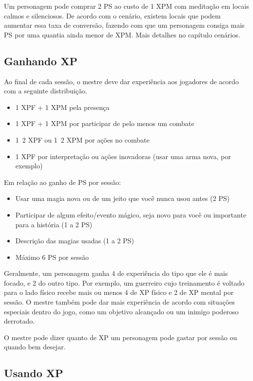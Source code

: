 Um personagem pode comprar 2 PS ao custo de 1 XPM com meditação em locais calmos e silenciosos. De acordo com o cenário, existem locais que podem aumentar essa taxa de conversão, fazendo com que um personagem consiga mais PS por uma quantia ainda menor de XPM. Mais detalhes no capítulo cenários.

\subsection{Ganhando XP}
	
Ao final de cada sessão, o mestre deve dar experiência aos jogadores de acordo com a seguinte distribuição. 

\begin{itemize}
\item  1 XPF + 1 XPM pela presença
\item  1 XPF + 1 XPM por participar de pelo menos um combate
\item  1~2 XPF ou 1~2 XPM por ações no combate
\item  1 XPF por interpretação ou ações inovadoras (usar uma arma nova, por exemplo)
\end{itemize}

	Em relação ao ganho de PS por sessão:
\begin{itemize}
\item Usar uma magia nova ou de um jeito que você nunca usou antes (2 PS)
\item Participar de algum efeito/evento mágico, seja novo para você ou importante para a história (1 a 2 PS)
\item Descrição das magias usadas (1 a 2 PS)
\item Máximo 6 PS por sessão 
\end{itemize}

Geralmente, um personagem ganha 4 de experiência do tipo que ele é mais focado, e 2 do outro tipo. Por exemplo, um guerreiro cujo treinamento é voltado para o lado físico recebe mais ou menos 4 de XP físico e 2 de XP mental por sessão. O mestre também pode dar mais experiência de acordo com situações especiais dentro do jogo, como um objetivo alcançado ou um inimigo poderoso derrotado.

O mestre pode dizer quanto de XP um personagem pode gastar por sessão ou quando bem desejar. 

\subsection{Usando XP}

